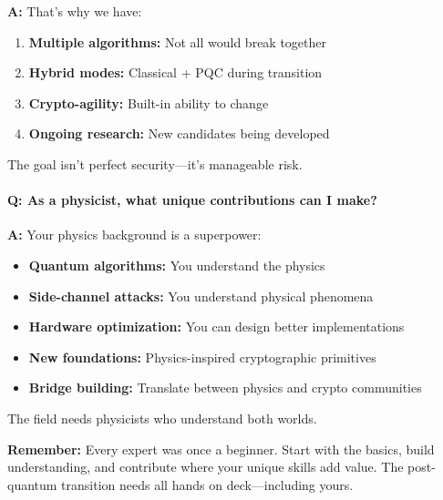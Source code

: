 \documentclass[11pt,a4paper]{article}
\begin{document}
\textbf{A:} That's why we have:

\begin{enumerate}
    \item \textbf{Multiple algorithms:} Not all would break together
    \item \textbf{Hybrid modes:} Classical + PQC during transition
    \item \textbf{Crypto-agility:} Built-in ability to change
    \item \textbf{Ongoing research:} New candidates being developed
\end{enumerate}

The goal isn't perfect security—it's manageable risk.

\paragraph{Q: As a physicist, what unique contributions can I make?}

\textbf{A:} Your physics background is a superpower:

\begin{itemize}
    \item \textbf{Quantum algorithms:} You understand the physics
    \item \textbf{Side-channel attacks:} You understand physical phenomena
    \item \textbf{Hardware optimization:} You can design better implementations
    \item \textbf{New foundations:} Physics-inspired cryptographic primitives
    \item \textbf{Bridge building:} Translate between physics and crypto communities
\end{itemize}

The field needs physicists who understand both worlds.

\textbf{Remember:} Every expert was once a beginner. Start with the basics, build understanding, and contribute where your unique skills add value. The post-quantum transition needs all hands on deck—including yours.
\end{document}
